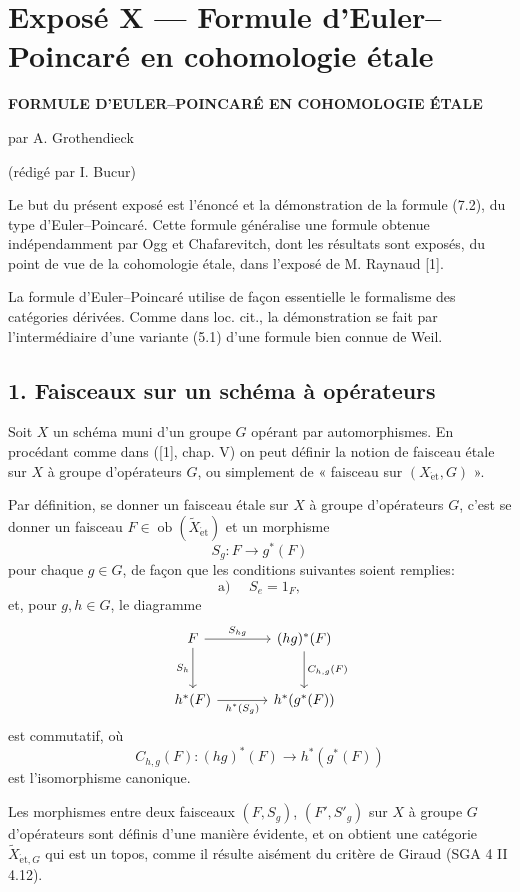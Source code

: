 \documentclass[11pt]{article}
\providecommand{\et}{\mathrm{\acute{e}t}}
\providecommand{\Ob}{\operatorname{ob}}
\providecommand{\Ob}{\operatorname{ob}}
\providecommand{\Ob}{\operatorname{Ob}}
\begin{document}
\section*{Exposé X --- Formule d'Euler--Poincaré en cohomologie étale}

\begin{center}
\textbf{FORMULE D'EULER--POINCARÉ EN COHOMOLOGIE ÉTALE}

par A. Grothendieck

(rédigé par I. Bucur)
\end{center}

Le but du présent exposé est l'énoncé et la démonstration de la formule (7.2), du type d'Euler--Poincaré. Cette formule généralise une formule obtenue indépendamment par Ogg et Chafarevitch, dont les résultats sont exposés, du point de vue de la cohomologie étale, dans l'exposé de M. Raynaud [1].

La formule d'Euler--Poincaré utilise de façon essentielle le formalisme des catégories dérivées. Comme dans loc. cit., la démonstration se fait par l'intermédiaire d'une variante (5.1) d'une formule bien connue de Weil.

\subsection*{1. Faisceaux sur un schéma à opérateurs}

Soit $X$ un schéma muni d'un groupe $G$ opérant par automorphismes. En procédant comme dans ([1], chap. V) on peut définir la notion de faisceau étale sur $X$ à groupe d'opérateurs $G$, ou simplement de « faisceau sur $(X_{\et},G)$ ».

Par définition, se donner un faisceau étale sur $X$ à groupe d'opérateurs $G$, c'est se donner un faisceau $F\in \Ob(\widetilde X_{\et})$ et un morphisme
\[
S_g:F\longrightarrow g^*(F)
\]
pour chaque $g\in G$, de façon que les conditions suivantes soient remplies:
\[
\text{a) }\quad S_e=1_F,
\]
et, pour $g,h\in G$, le diagramme
\[
\begin{tikzcd}[column sep=large,row sep=large]
F \arrow[r,"S_{hg}"] \arrow[d,"S_h"'] & (hg)^*(F) \arrow[d,"C_{h,g}(F)"]\\
h^*(F) \arrow[r,"h^*(S_g)"'] & h^*(g^*(F))
\end{tikzcd}
\]
est commutatif, où
\[
C_{h,g}(F):(hg)^*(F)\longrightarrow h^*(g^*(F))
\]
est l'isomorphisme canonique.

Les morphismes entre deux faisceaux $(F,S_g)$, $(F',S'_g)$ sur $X$ à groupe $G$ d'opérateurs sont définis d'une manière évidente, et on obtient une catégorie $\widetilde X_{\et,G}$ qui est un topos, comme il résulte aisément du critère de Giraud (SGA 4 II 4.12).
\end{document}
